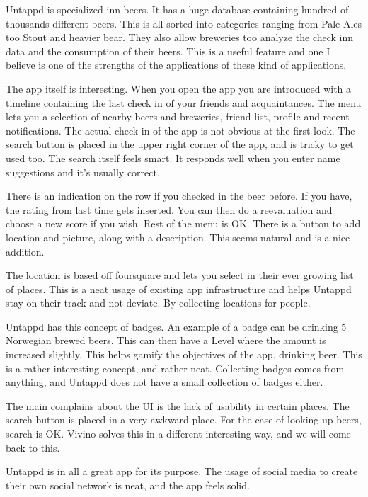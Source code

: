 \documentclass[12pt]{article}
\begin{document}
Untappd is specialized inn beers. It has a huge database containing hundred of
thousands different beers. This is all sorted into categories ranging from Pale
Ales too Stout and heavier bear. They also allow breweries too analyze the check
inn data and the consumption of their beers. This is a useful feature and one I
believe is one of the strengths of the applications of these kind of
applications.

The app itself is interesting. When you open the app you are introduced with
a timeline containing the last check in of your friends and acquaintances. The
menu lets you a selection of nearby beers and breweries, friend list, profile and
recent notifications. The actual check in of the app is not obvious at the first
look. The search button is placed in the upper right corner of the app, and is
tricky to get used too. The search itself feels smart. It responds well when you
enter name suggestions and it's usually correct.

There is an indication on the row if you checked in the beer before. If you
have, the rating from last time gets inserted. You can then do a reevaluation
and choose a new score if you wish. Rest of the menu is OK. There is a button to
add location and picture, along with a description. This seems natural and is a
nice addition.

The location is based off foursquare and lets you select in their ever growing
list of places. This is a neat usage of existing app infrastructure and helps
Untappd stay on their track and not deviate. By collecting locations for
people.

Untappd has this concept of badges. An example of a badge can be drinking 5
Norwegian brewed beers. This can then have a Level where the amount is increased
slightly. This helps gamify the objectives of the app, drinking beer. This is a
rather interesting concept, and rather neat. Collecting badges comes from
anything, and Untappd does not have a small collection of badges either.

The main complains about the UI is the lack of usability in certain places. The
search button is placed in a very awkward place. For the case of looking up
beers, search is OK. Vivino solves this in a different interesting way, and we
will come back to this.

Untappd is in all a great app for its purpose. The usage of social media to
create their own social network is neat, and the app feels solid.
\end{document}
